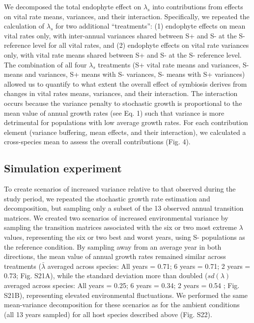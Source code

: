 \documentclass[9pt,twocolumn,twoside]{pnas-new}
\begin{document}
{We decomposed the total endophyte effect on $\lambda_s$ into contributions from effects on vital rate means, variances, and their interaction. 
Specifically, we repeated the calculation of $\lambda_s$ for two additional ``treatments'': (1) endophyte effects on mean vital rates only, with inter-annual variances shared between S+ and S- at the S- reference level for all vital rates, and (2) endophyte effects on vital rate variances only, with vital rate means shared between S+ and S- at the S- reference level. 
The combination of all four $\lambda_s$ treatments (S+ vital rate means and variances, S- means and variances, S+ means with S- variances, S- means with S+ variances) allowed us to quantify to what extent the overall effect of symbiosis derives from changes in vital rates means, variances, and their interaction. 
The interaction occurs because the variance penalty to stochastic growth is proportional to the mean value of annual growth rates (see Eq. 1) such that variance is more detrimental for populations with low average growth rates. 
For each contribution element (variance buffering, mean effects, and their interaction), we calculated a cross-species mean to assess the overall contributions (Fig. 4).

\subsection*{Simulation experiment}
To create scenarios of increased variance relative to that observed during the study period, we repeated the stochastic growth rate estimation and decomposition, but sampling only a subset of the 13 observed annual transition matrices. 
We created two scenarios of increased environmental variance by sampling the transition matrices associated with the six or two most extreme $\lambda$ values, representing the six or two best and worst years, using S- populations as the reference condition. 
By sampling away from an average year in both directions, the mean value of annual growth rates remained similar across treatments ($\bar{\lambda}$ averaged across species: All years = 0.71; 6 years = 0.71; 2 years = 0.73; Fig. S21A), while the standard deviation more than doubled ($sd(\lambda)$ averaged across species: All years = 0.25; 6 years = 0.34; 2 years = 0.54 ; Fig. S21B), representing elevated environmental fluctuations.
We performed the same mean-variance decomposition for these scenarios as for the ambient conditions (all 13 years sampled) for all host species described above (Fig. S22). 

}
\showmatmethods{} %
\end{document}
